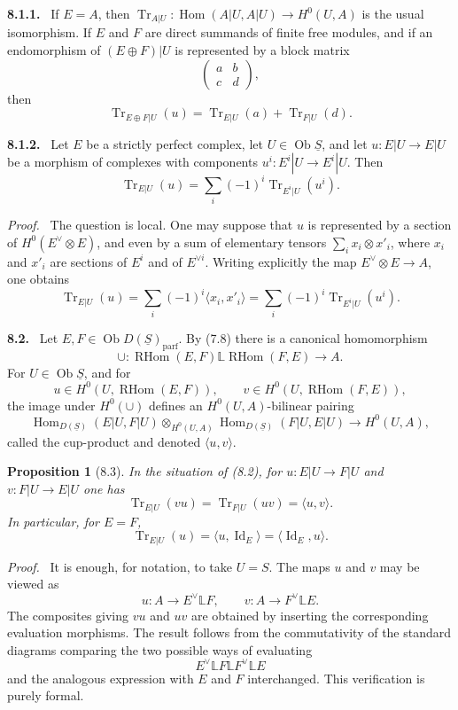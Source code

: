 \documentclass[11pt]{article}
\theoremstyle{plain}
\newtheorem*{proposition*}{Proposition}
\theoremstyle{definition}
\theoremstyle{remark}
\newenvironment{statement}[1]{\par\medskip\noindent\textbf{#1.}\ }{\par\medskip}
\newenvironment{prooftext}{\par\noindent\textit{Proof.}\ }{\par\medskip}
\DeclareMathOperator{\Hom}{Hom}
\DeclareMathOperator{\ob}{Ob}
\DeclareMathOperator{\Tr}{Tr}
\DeclareMathOperator{\RHom}{RHom}
\providecommand{\uS}{\underline{S}}
\providecommand{\bbL}{\mathbb{L}}
\begin{document}
\begin{statement}{8.1.1}
If $E=A$, then $\Tr_{A|U}:\Hom(A|U,A|U)\to H^0(U,A)$ is the usual isomorphism. If $E$ and $F$ are direct summands of finite free modules, and if an endomorphism of $(E\oplus F)|U$ is represented by a block matrix
\[
\begin{pmatrix}a&b\\ c&d\end{pmatrix},
\]
then
\[
\Tr_{E\oplus F|U}(u)=\Tr_{E|U}(a)+\Tr_{F|U}(d).
\]
\end{statement}

\begin{statement}{8.1.2}
Let $E$ be a strictly perfect complex, let $U\in\ob\uS$, and let $u:E|U\to E|U$ be a morphism of complexes with components $u^i:E^i|U\to E^i|U$. Then
\[
\Tr_{E|U}(u)=\sum_i(-1)^i\Tr_{E^i|U}(u^i).
\]
\end{statement}

\begin{prooftext}
The question is local. One may suppose that $u$ is represented by a section of $H^0(E^\vee\otimes E)$, and even by a sum of elementary tensors $\sum_i x_i\otimes x'_i$, where $x_i$ and $x'_i$ are sections of $E^i$ and of $E^{\vee i}$. Writing explicitly the map $E^\vee\otimes E\to A$, one obtains
\[
\Tr_{E|U}(u)=\sum_i(-1)^i\langle x_i,x'_i\rangle
=\sum_i(-1)^i\Tr_{E^i|U}(u^i).
\]
\end{prooftext}

\begin{statement}{8.2}
Let $E,F\in\ob D(\uS)_{\mathrm{parf}}$. By (7.8) there is a canonical homomorphism
\[
\cup:\RHom(E,F)\bbL\RHom(F,E)\longrightarrow A.
\]
For $U\in\ob\uS$, and for
\[
u\in H^0(U,\RHom(E,F)),\qquad
v\in H^0(U,\RHom(F,E)),
\]
the image under $H^0(\cup)$ defines an $H^0(U,A)$-bilinear pairing
\[
\Hom_{D(\uS)}(E|U,F|U)\otimes_{H^0(U,A)}
\Hom_{D(\uS)}(F|U,E|U)
\longrightarrow H^0(U,A),
\]
called the cup-product and denoted $\langle u,v\rangle$.
\end{statement}

\begin{proposition*}[8.3]
In the situation of (8.2), for $u:E|U\to F|U$ and $v:F|U\to E|U$ one has
\[
\Tr_{E|U}(vu)=\Tr_{F|U}(uv)=\langle u,v\rangle.
\]
In particular, for $E=F$,
\[
\Tr_{E|U}(u)=\langle u,\operatorname{Id}_E\rangle
=\langle\operatorname{Id}_E,u\rangle.
\]
\end{proposition*}

\begin{prooftext}
It is enough, for notation, to take $U=S$. The maps $u$ and $v$ may be viewed as
\[
u:A\to E^\vee\bbL F,
\qquad
v:A\to F^\vee\bbL E.
\]
The composites giving $vu$ and $uv$ are obtained by inserting the corresponding evaluation morphisms. The result follows from the commutativity of the standard diagrams comparing the two possible ways of evaluating
\[
E^\vee\bbL F\bbL F^\vee\bbL E
\]
and the analogous expression with $E$ and $F$ interchanged. This verification is purely formal.
\end{prooftext}
\end{document}
